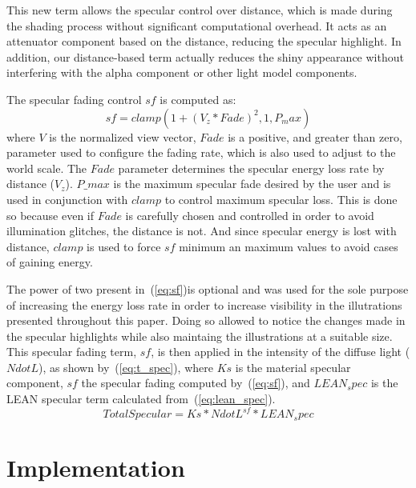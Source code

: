 \documentclass[10pt, conference]{IEEEtran}
\begin{document}
This new term allows the specular control over distance, which is made during the shading process without significant computational overhead. It acts as an attenuator component based on the distance, reducing the specular highlight. In addition, our distance-based term actually reduces the shiny appearance without interfering with the alpha component or other light model components.

The specular fading control $sf$ is computed as:
\begin{equation}
	\label{eq:sf}
	sf = clamp(1 + (V_{z} * Fade)^{2}, 1, P_max)
\end{equation}
where $V$ is the normalized view vector, $Fade$ is a positive, and greater than zero, parameter used to configure the fading rate, which is also used to adjust to the world scale. The $Fade$ parameter determines the specular energy loss rate by distance ($V_{z}$). $P\_{max}$ is the maximum specular fade desired by the user and is used in conjunction with $clamp$ to control maximum specular loss. This is done so because even if $Fade$ is carefully chosen and controlled in order to avoid illumination glitches, the distance is not. And since specular energy is lost with distance, $clamp$ is used to force $sf$ minimum an maximum values to avoid cases of gaining energy.

The power of two present in~(\ref{eq:sf})is optional and was used for the sole purpose of increasing the energy loss rate in order to increase visibility in the illutrations presented throughout this paper. Doing so allowed to notice the changes made in the specular highlights while also maintaing the illustrations at a suitable size. This specular fading term, $sf$, is then applied in the intensity of the diffuse light ($NdotL$), as shown by~(\ref{eq:t_spec}), where $Ks$ is the material specular component, $sf$ the specular fading computed by~(\ref{eq:sf}), and $LEAN_spec$ is the LEAN specular term calculated from~(\ref{eq:lean_spec}).
\begin{equation}
	\label{eq:t_spec}
	TotalSpecular = Ks * NdotL^{sf} * LEAN_spec
\end{equation}


\section{Implementation}
\label{sec:implementation}
\end{document}
